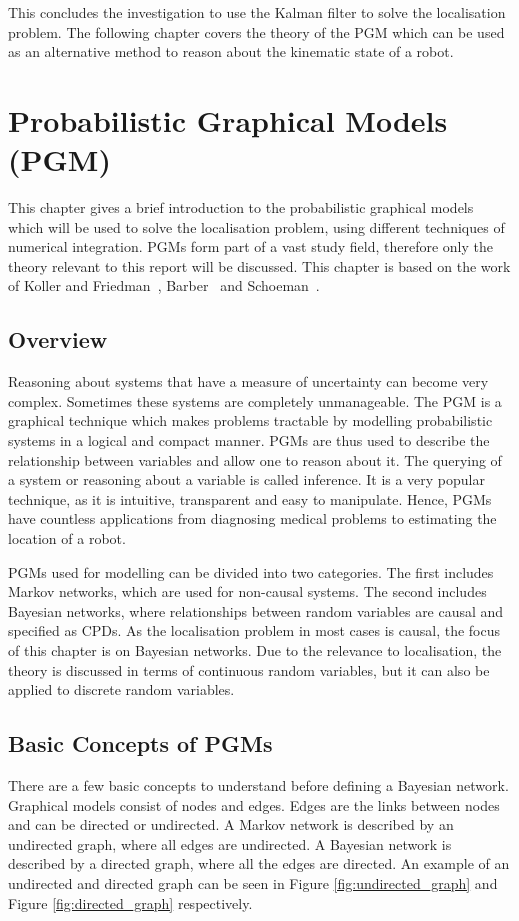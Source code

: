 \documentclass[12pt,oneside,openany,a4paper, %
afrikaans,english,
]{memoir}
\numberwithin{equation}{chapter}
\begin{document}
{This concludes the investigation to use the Kalman filter to solve the localisation problem. The following chapter covers the theory of the PGM which can be used as an alternative method to reason about the kinematic state of a robot.

\chapter{Probabilistic Graphical Models (PGM)}
This chapter gives a brief introduction to the probabilistic graphical models which will be used to solve the localisation problem, using different techniques of numerical integration. PGMs form part of a vast study field, therefore only the theory relevant to this report will be discussed. This chapter is based on the work of Koller and Friedman~\cite{koller}, Barber~\cite{barber} and Schoeman~\citep{JC}.
\section{Overview}
Reasoning about systems that have a measure of uncertainty can become very complex. Sometimes these systems are completely unmanageable. The PGM is a graphical technique which makes problems tractable by modelling probabilistic systems in a logical and compact manner. PGMs are thus used to describe the relationship between variables and allow one to reason about it. The querying of a system or reasoning about a variable is called inference. It is a very popular technique, as it is intuitive, transparent and easy to manipulate. Hence, PGMs have countless applications from diagnosing medical problems to estimating the location of a robot.

PGMs used for modelling can be divided into two categories. The first includes Markov networks, which are used for non-causal systems. The second includes Bayesian networks, where relationships between random variables are causal and specified as CPDs. As the localisation problem in most cases is causal, the focus of this chapter is on Bayesian networks. Due to the relevance to localisation, the theory is discussed in terms of continuous random variables, but it can also be applied to discrete random variables. 
\section{Basic Concepts of PGMs}
There are a few basic concepts to understand before defining a Bayesian network. Graphical models consist of nodes and edges. Edges are the links between nodes and can be directed or undirected. A Markov network is described by an undirected graph, where all edges are undirected. A Bayesian network is described by a directed graph, where all the edges are directed. An example of an undirected and directed graph can be seen in Figure \ref{fig:undirected_graph} and Figure \ref{fig:directed_graph} respectively.

}
\end{document}
